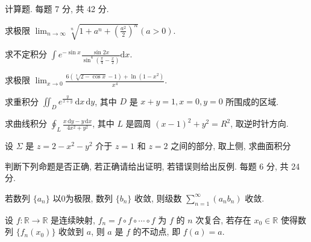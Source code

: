 \par{}
计算题. 每题 7 分, 共 42 分.\par
求极限 $\lim_{n\to \infty}\sqrt[n]{1 + a^n +\left(\frac{a^2}{2}\right)^n}$$(a > 0)$.\par
求不定积分 $\int e^{-\sin x} \frac{\sin 2x}{\sin^4\left(\frac{\pi}{4} - \frac{x}{2}\right)} \mathrm{d}x.$\par
求极限 $\lim_{x\to 0}\frac{6\left(\sqrt[3]{2 - \cos x} - 1\right) + \ln(1 - x^2)}{x^4}$.\par
求重积分 $\iint_{D} e^{\frac{y}{x + y}} \, \mathrm{d}x \, \mathrm{d}y$, 其中 $D$ 是 $x + y = 1, x = 0, y = 0$ 所围成的区域.\par
求曲线积分 $\oint_{L} \frac{x \, \mathrm{d}y - y \, \mathrm{d}x}{4x^{2} + y^{2}}$, 其中 $L$ 是圆周 $(x - 1)^{2} + y^{2} = R^{2}$, 取逆时针方向.\par
\par{}
设 $\Sigma$ 是 $z = 2 - x^2 - y^2$ 介于 $z = 1$ 和 $z = 2$ 之间的部分, 取上侧, 求曲面积分\par
\nopagebreak[4]
\par{}
判断下列命题是否正确, 若正确请给出证明, 若错误则给出反例. 每题 6 分, 共 24 分.\par
若数列 $\{a_{n}\}$ 以0为极限, 数列 $\{b_{n}\}$ 收敛, 则级数 $\sum_{n=1}^{\infty}(a_{n}b_{n})$ 收敛.\par
设 $f: \mathbb{R} \to \mathbb{R}$ 是连续映射, $f_n = f \circ f \circ \cdots \circ f$ 为 $f$ 的 $n$ 次复合, 若存在 $x_0 \in \mathbb{R}$ 使得数列 $\{f_n(x_0)\}$ 收敛到 $a$, 则 $a$ 是 $f$ 的不动点, 即 $f(a) = a$.\par
$$
